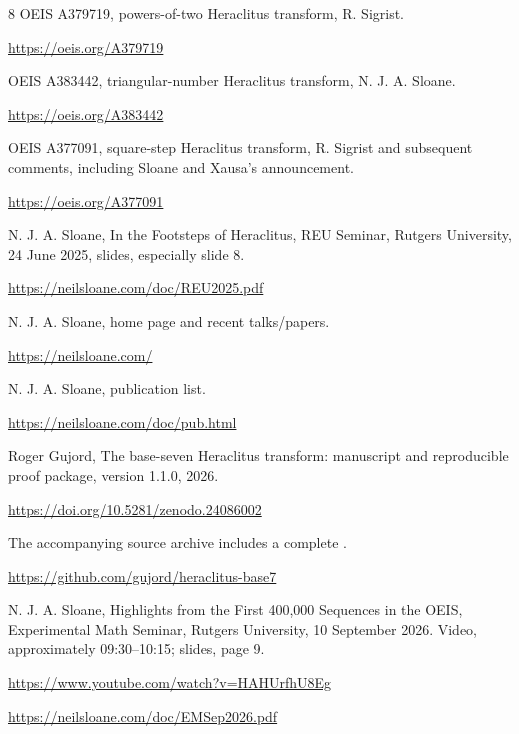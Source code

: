 \documentclass[11pt,a4paper]{article}
\begin{document}
\clearpage
\begin{thebibliography}{8}
 OEIS A379719, powers-of-two Heraclitus transform, R. Sigrist.
\par\mbox{\small\url{https://oeis.org/A379719}}

 OEIS A383442, triangular-number Heraclitus transform, N. J. A. Sloane.
\par\mbox{\small\url{https://oeis.org/A383442}}

 OEIS A377091, square-step Heraclitus transform, R. Sigrist and subsequent comments, including Sloane and Xausa's announcement.
\par\mbox{\small\url{https://oeis.org/A377091}}

 N. J. A. Sloane, In the Footsteps of Heraclitus, REU Seminar, Rutgers University, 24 June 2025, slides, especially slide 8.
\par\mbox{\small\url{https://neilsloane.com/doc/REU2025.pdf}}

 N. J. A. Sloane, home page and recent talks/papers.
\par\mbox{\small\url{https://neilsloane.com/}}

 N. J. A. Sloane, publication list.
\par\mbox{\small\url{https://neilsloane.com/doc/pub.html}}

 Roger Gujord, The base-seven Heraclitus transform:
manuscript and reproducible proof package, version 1.1.0, 2026.
\par\mbox{\small\url{https://doi.org/10.5281/zenodo.24086002}}
\par The accompanying source
archive includes a complete .
\par\mbox{\small\url{https://github.com/gujord/heraclitus-base7}}

 N. J. A. Sloane, Highlights from the First 400,000
Sequences in the OEIS, Experimental Math Seminar, Rutgers University,
10 September 2026. Video, approximately 09:30--10:15; slides, page 9.
\par\mbox{\small\url{https://www.youtube.com/watch?v=HAHUrfhU8Eg}}
\par\mbox{\small\url{https://neilsloane.com/doc/EMSep2026.pdf}}

\end{thebibliography}

\clearpage

\end{document}
